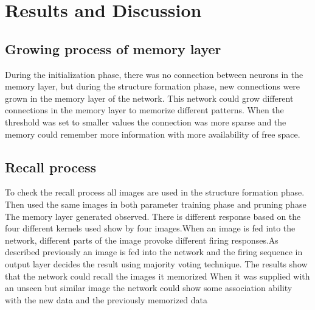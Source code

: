 \chapter{Results and Discussion}

\section{Growing process of memory layer}
During the initialization phase, there was no connection between neurons in the
memory layer, but during the structure formation phase, new connections were
grown in the memory layer of the network. This network could grow different
connections in the memory layer to memorize different patterns. When the
threshold was set to smaller values the connection was more sparse and the
memory could remember more information with more availability of free space.
\section{Recall process}
To check the recall process all images are used in the structure formation
phase. Then used the same images in both parameter training phase and pruning
phase The memory layer generated observed. There is different response based on
the four different kernels used show by four images.When an image is fed into
the network, different parts of the image provoke different firing responses.As
described previously an image is fed into the network and the firing sequence
in output layer decides the result using majority voting technique. The results
show that the network could recall the images it memorized When it was supplied
with an unseen but similar image the network could show some association
ability with the new data and the previously memorized data